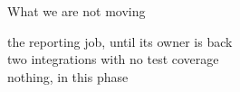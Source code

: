 \begin{frame}{What we are not moving}
  \begin{console}
    the reporting job, until its owner is back\\
    two integrations with no test coverage\\
    nothing, in this phase
  \end{console}
\end{frame}
